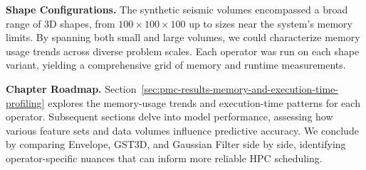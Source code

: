 \vspace{1em}
\noindent
\textbf{Shape Configurations.}
The synthetic seismic volumes encompassed a broad range of \ac{3D} shapes, from $100 \times 100 \times 100$ up to sizes near the system’s memory limits.
By spanning both small and large volumes, we could characterize memory usage trends across diverse problem scales.
Each operator was run on each shape variant, yielding a comprehensive grid of memory and runtime measurements.

\vspace{1em}
\noindent
\textbf{Chapter Roadmap.}
Section~\ref{sec:pmc-results-memory-and-execution-time-profiling} explores the memory-usage trends and execution-time patterns for each operator.
Subsequent sections delve into model performance, assessing how various feature sets and data volumes influence predictive accuracy.
We conclude by comparing Envelope, \ac{GST3D}, and Gaussian Filter side by side, identifying operator-specific nuances that can inform more reliable \ac{HPC} scheduling.